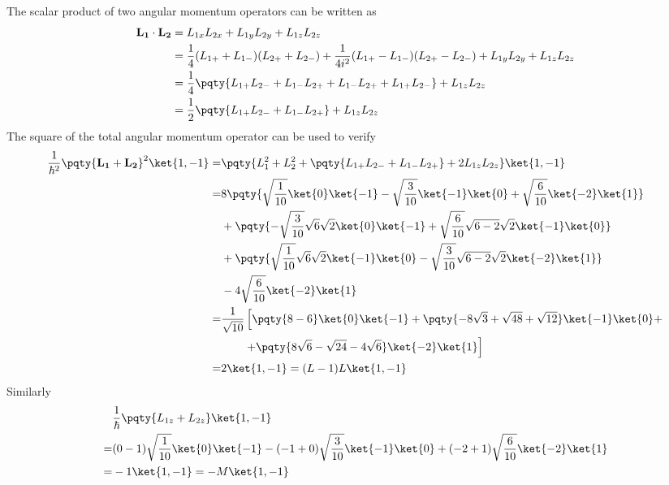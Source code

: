\documentclass[12pt]{article}
\begin{document}
        The scalar product of two angular momentum operators can be written as \begin{align*}
            \bf L_1 \cdot \bf L_2 &= L_{1x}  L_{2x} + L_{1y} L_{2y} + L_{1z}L_{2z}\\
            &= \frac{1}{4} (L_{1 +} + L_{1 -}) (L_{2 +} + L_{2 -}) + \frac{1}{4i^2} (L_{1 +} - L_{1 -})(L_{2 +} - L_{2 -}) + L_{1y} L_{2y} + L_{1z}L_{2z}\\
            &= \frac{1}{4} \pqty{L_{1 + }L_{2 -} + L_{1 -}L_{2 +} + L_{1 -}L_{2 +} + L_{1 +}L_{2 -}} + L_{1z} L_{2z}\\
            &= \frac{1}{2} \pqty{L_{1 + }L_{2 -} + L_{1 -}L_{2 + }} + L_{1z} L_{2z}
        \end{align*}
        The square of the total angular momentum operator can be used to verify
        \begin{align*}
            \frac{1}{\hbar^2}\pqty{\bf L_1 +\bf L_2}^2\ket{1, -1} =& \pqty{L_1^2 + L_2^2 + \pqty{L_{1 + }L_{2 -} + L_{1 -}L_{2 + }} + 2L_{1z} L_{2z}}\ket{1, -1}\\
            =& 8\pqty{\sqrt{\frac{1}{10}}  \ket{0} \ket{ -1} - \sqrt{\frac{3}{10}} \ket{ -1} \ket{0} + \sqrt{\frac{6}{10}} \ket{ -2} \ket{1} } \\ 
            &+ \pqty{ -\sqrt{\frac{3}{10}} \sqrt{6}\sqrt{2}\ket{0} \ket{ - 1} + \sqrt{\frac{6}{10}} \sqrt{6 - 2}\sqrt{2}\ket{ - 1} \ket{0}  } \\
            &+\pqty{\sqrt{\frac{1}{10}} \sqrt{6}\sqrt{2}\ket{ - 1} \ket{ 0} - \sqrt{\frac{3}{10}}\sqrt{6 - 2}\sqrt{2} \ket{ - 2} \ket{1}}\\
            &- 4\sqrt{\frac{6}{10}} \ket{ -2} \ket{1}\\
            =& \frac{1}{\sqrt{10}}\left[ \pqty{8 -6 }\ket{0} \ket{ -1} + \pqty{ - 8 \sqrt{3} + \sqrt{48} + \sqrt{12} } \ket{ - 1} \ket{0} + \right. \\
            &\qquad\left. +\pqty{8 \sqrt{6} - \sqrt{24} - 4 \sqrt{6} } \ket{ - 2} \ket{1}  \right]\\
            =& 2 \ket{1, - 1}
            = (L - 1)L \ket{1, - 1}
        \end{align*}
        Similarly \begin{align*}
            &\frac{1}{\hbar} \pqty{L_{1z} + L_{2z}} \ket{1, - 1} \\
            =& (0 - 1)\sqrt{\frac{1}{10}} \ket{0} \ket{ -1} - ( - 1 + 0) \sqrt{\frac{3}{10}} \ket{ -1} \ket{0} + ( - 2 + 1)\sqrt{\frac{6}{10}} \ket{ -2} \ket{1} \\
            =& - 1\ket{1, - 1}
            = - M\ket{1, - 1}
        \end{align*}
\end{document}
